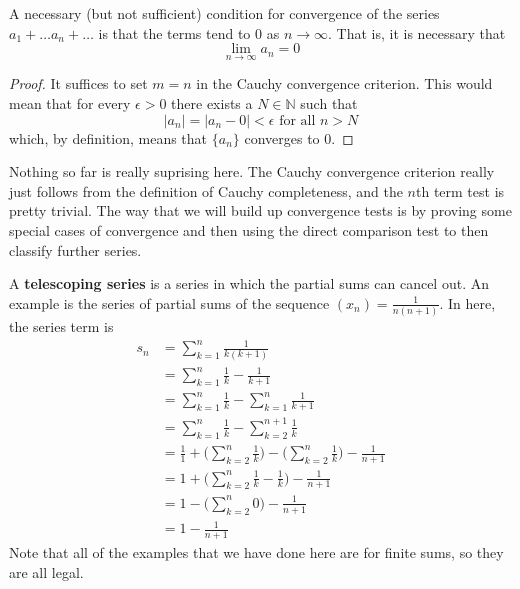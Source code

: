   \begin{corollary}
    A necessary (but not sufficient) condition for convergence of the series $a_1 + \ldots a_n + \ldots$ is that the terms tend to $0$ as $n \rightarrow \infty$. That is, it is necessary that
    \begin{equation}
      \lim_{n\rightarrow \infty} a_n = 0
    \end{equation}
  \end{corollary}
  \begin{proof}
    It suffices to set $m = n$ in the Cauchy convergence criterion. This would mean that for every $\epsilon > 0$ there exists a $N \in \mathbb{N}$ such that 
    \begin{equation}
      |a_n| = |a_n - 0| < \epsilon \text{ for all } n > N
    \end{equation}
    which, by definition, means that $\{a_n\}$ converges to $0$. 
  \end{proof} 

  Nothing so far is really suprising here. The Cauchy convergence criterion really just follows from the definition of Cauchy completeness, and the $n$th term test is pretty trivial. The way that we will build up convergence tests is by proving some special cases of convergence and then using the direct comparison test to then classify further series.     

  \begin{example}
    A \textbf{telescoping series} is a series in which the partial sums can cancel out. An example is the series of partial sums of the sequence $(x_n) = \frac{1}{n (n+1)}$. In here, the series term is
    \begin{align}
      s_n & = \sum_{k=1}^n \frac{1}{k(k+1)} \\ 
          & = \sum_{k=1}^n \frac{1}{k} - \frac{1}{k+1} \\
          & = \sum_{k=1}^n \frac{1}{k} - \sum_{k=1}^n \frac{1}{k+1} \\
          & = \sum_{k=1}^n \frac{1}{k} - \sum_{k=2}^{n+1} \frac{1}{k} \\
          & = \frac{1}{1} + \bigg( \sum_{k=2}^n \frac{1}{k} \bigg) - \bigg( \sum_{k=2}^n \frac{1}{k} \bigg) - \frac{1}{n+1} \\
          & = 1 + \bigg( \sum_{k=2}^n \frac{1}{k} - \frac{1}{k} \bigg) - \frac{1}{n+1} \\
          & = 1 - \bigg( \sum_{k=2}^n 0 \bigg) - \frac{1}{n+1} \\
          & = 1 - \frac{1}{n+1} 
    \end{align} 
    Note that all of the examples that we have done here are for finite sums, so they are all legal. 
  \end{example}

